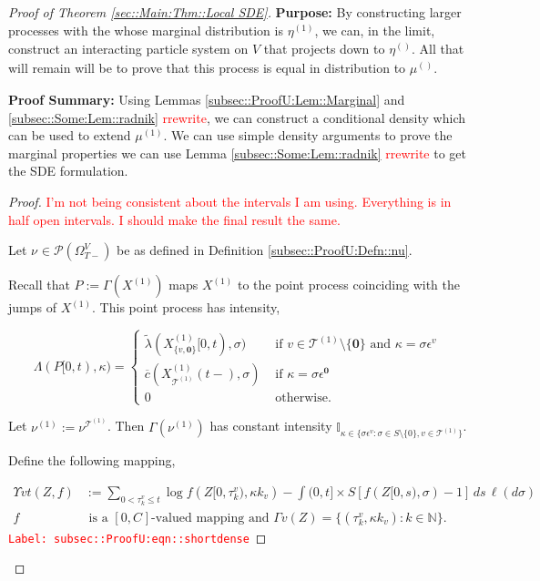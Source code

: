 \documentclass[12pt]{article}
\newcommand{\mb}{\mathbb}
\newcommand{\mc}{\mathcal}
\newcommand{\ov}{\overline}
\newcommand{\te}{\text}
\newcommand{\ep}{\epsilon}
\newcommand{\tr}{\textcolor{red}}
\newcommand{\labe}[1]{\tr{\texttt{Label: #1}}}
\newcommand{\purpose}{\textbf{Purpose: }}
\newcommand{\pfsum}{\textbf{Proof Summary: }}
\newcommand{\ind}{\hspace{24pt}}
\newcommand{\defeq}{:=}								%
\newcommand{\pmsr}{\mc{P}}							%
\renewcommand{\root}{\mathbf{0}}				%
\renewcommand{\v}{v}							%
\renewcommand{\S}{S}							%
\newcommand{\s}{\sigma}							%
\newcommand{\ev}{\ep}							%
\newcommand{\T}{T}								%
\renewcommand{\t}{t}							%
\newcommand{\sset}{\Omega}						%
\renewcommand{\tt}{s}							%
\newcommand{\X}{X}								%
\newcommand{\vind}[1]{^{#1}}					%
\newcommand{\vsi}[1]{^{#1}}						%
\newcommand{\cind}[1]{_{#1}}					%
\newcommand{\tp}[1]{(#1)}						%
\newcommand{\tip}[1]{#1}						%
\newcommand{\ts}[1]{_{#1}}						%
\newcommand{\const}{C}							%
\newcommand{\IGrg}{\ov{c}}						%
\newcommand{\tree}{\mc{T}}						%
\newcommand{\sln}[1]{^{(#1)}}					%
\newcommand{\Sm}{\ell}							%
\newcommand{\alt}[1]{\widetilde{#1}}			%
\newcommand{\indx}[1]{_{#1}}					%
\newcommand{\m}{\mu}							%
\newcommand{\mm}{\nu}							%
\newcommand{\mmm}{\eta}							%
\newcommand{\XXX}{Z}							%
\newcommand{\rt}{\tau}							%
\renewcommand{\it}{k}							%
\newcommand{\pmap}{\Gamma}						%
\renewcommand{\mark}{\kappa}					%
\newcommand{\rp}{P}								%
\newcommand{\ratee}{\Lambda}					%
\newcommand{\crate}{\alt{\lambda}}				%
\newcommand{\ds}{\Upsilon}						%
\begin{document}
\begin{proof}[Proof of Theorem \ref{sec::Main:Thm::Local SDE}]
\purpose By constructing larger processes with the whose marginal distribution is \(\mmm\sln{1}\ts{}\), we can, in the limit, construct an interacting particle system on \(V\) that projects down to \(\mmm\sln{}\ts{}\). All that will remain will be to prove that this process is equal in distribution to \(\m\sln{}\ts{}\).

\pfsum Using Lemmas \ref{subsec::ProofU:Lem::Marginal} and \ref{subsec::Some:Lem::radnik} \tr{rrewrite}, we can construct a conditional density which can be used to extend \(\mu\sln{1}\). We can use simple density arguments to prove the marginal properties we can use Lemma \ref{subsec::Some:Lem::radnik} \tr{rrewrite} to get the SDE formulation.

\begin{proof}
\tr{I'm not being consistent about the intervals I am using. Everything is in half open intervals. I should make the final result the same.}

Let \(\mm\vind{}\ts{} \in \pmsr(\sset\vsi{V}\ts{\T-})\) be as defined in Definition \ref{subsec::ProofU:Defn::nu}.

\ind Recall that \(\rp{} \defeq \pmap{}(\X\sln{1}\cind{}\tip{})\) maps \(\X\sln{1}\cind{}\tip{}\) to the point process coinciding with the jumps of \(\X\sln{1}\cind{}\tip{}\). This point process has intensity,

\[\ratee{}(\rp{}[0,\t),\mark{}) = \begin{cases}
\crate{}{}(\X\sln{1}\cind{\{\v,\root\}}\tip{[0,\t)},\s) &\te{ if } \v\in \tree\sln{1}\setminus\{\root\}\te{ and } \mark{} = \s\ev\vind{\v}\\
\IGrg{}(\X\sln{1}\cind{\tree\sln{1}}\tp{\t-},\s) &\te{ if } \mark{} = \s\ev\vind{\root}\\
0 &\te{ otherwise}.
\end{cases}\]

Let \(\mm\sln{1}\ts{} \defeq \mm\vind{\tree\sln{1}}\ts{}\). Then \(\pmap{}(\mm\sln{1}\ts{})\) has constant intensity \(\mb{I}_{\kappa \in\{\s\ev\vind{\v}:\s\in\S\setminus\{0\},\v\in\tree\sln{1}\}}\). 

\ind Define the following mapping,

\begin{align}
\ds{\v}{\t}(\XXX{}{},f) &\defeq \sum_{0 < \rt\indx{\it}\vind{\v} \leq \t} \log{f(\XXX{}{[0,\rt\indx{\it}\vind{\v})},\mark{\it}_\v)} - \int{(0,\t]\times \S} [f(\XXX{}{[0,\tt)},\s) - 1]\,ds\,\Sm(d\s) \label{subsec::ProofU:eqn::shortdense}\\
f&\te{ is a }[0,\const\indx{}] \te{-valued mapping and } \pmap{\v}(\XXX{}{}) = \{(\rt\indx{\it}\vind{\v},\mark{\it}_\v):\it\in\mb{N}\}.\nonumber
\end{align} 
\labe{subsec::ProofU:eqn::shortdense}


\end{proof}
\end{proof}
\end{document}
